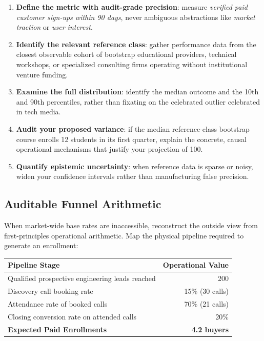 \begin{enumerate}[leftmargin=12pt,itemsep=2pt,topsep=1pt,parsep=0pt]
  \item \textbf{Define the metric with audit-grade precision}: measure \textit{verified paid customer sign-ups within 90 days}, never ambiguous abstractions like \textit{market traction} or \textit{user interest}.
  \item \textbf{Identify the relevant reference class}: gather performance data from the closest observable cohort of bootstrap educational providers, technical workshops, or specialized consulting firms operating without institutional venture funding.
  \item \textbf{Examine the full distribution}: identify the median outcome and the 10th and 90th percentiles, rather than fixating on the celebrated outlier celebrated in tech media.
  \item \textbf{Audit your proposed variance}: if the median reference-class bootstrap course enrolls 12 students in its first quarter, explain the concrete, causal operational mechanisms that justify your projection of 100.
  \item \textbf{Quantify epistemic uncertainty}: when reference data is sparse or noisy, widen your confidence intervals rather than manufacturing false precision.
\end{enumerate}

\subsection{Auditable Funnel Arithmetic}

When market-wide base rates are inaccessible, reconstruct the outside view from first-principles operational arithmetic. Map the physical pipeline required to generate an enrollment:

\begin{tcolorbox}[
  enhanced,
  colback=BayesSurface!60,
  colframe=BayesBorder,
  boxrule=0.5pt,
  arc=3pt,
  left=3pt,right=3pt,top=3pt,bottom=3pt,
  boxsep=1pt
]
\scriptsize
\begin{tabularx}{\linewidth}{X r}
\toprule
\textbf{Pipeline Stage} & \textbf{Operational Value} \\
\midrule
Qualified prospective engineering leads reached & 200 \\
Discovery call booking rate & 15\% (30 calls) \\
Attendance rate of booked calls & 70\% (21 calls) \\
Closing conversion rate on attended calls & 20\% \\
\midrule
\textbf{Expected Paid Enrollments} & \textbf{4.2 buyers} \\
\bottomrule
\end{tabularx}
\end{tcolorbox}

